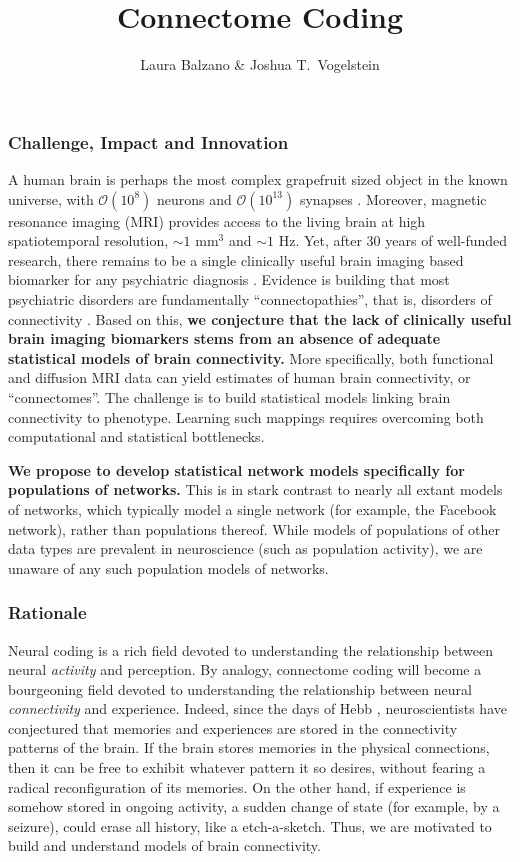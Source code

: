\documentclass[times,11pt]{article} %
\title{\vspace{-50pt}Connectome Coding}
\author{Laura Balzano \& Joshua T.~Vogelstein}
\date{}
\begin{document}
\renewcommand\thepage{C-1}


\maketitle

\subsubsection*{Challenge, Impact and Innovation}

A human brain is perhaps the most complex grapefruit sized object in the known universe, with $\mathcal{O}(10^8)$ neurons and $\mathcal{O}(10^{13})$ synapses \cite{??}.   Moreover,  magnetic resonance imaging (MRI) provides access to the living brain at high spatiotemporal resolution, $\sim$$1$ mm$^3$ and $\sim$$1$ Hz.  Yet, after 30 years of well-funded research, there remains to be a single clinically useful brain imaging based biomarker for any psychiatric diagnosis \cite{APA}. 
% 
Evidence is building that most psychiatric disorders are fundamentally ``connectopathies'', that is, disorders of connectivity \cite{??}. Based on this, 
\textbf{we conjecture that the lack of clinically useful brain imaging biomarkers stems from an absence of adequate statistical models of brain connectivity.} More specifically, both functional and diffusion MRI data can yield estimates of human brain connectivity, or ``connectomes''.  The challenge is to build statistical models linking brain connectivity to phenotype.  Learning such mappings requires overcoming both computational and statistical bottlenecks.

% 
\textbf{We propose to develop statistical network models specifically for populations of networks. }  This is in stark contrast to nearly all extant models of networks, which typically model a single network (for example, the Facebook network), rather than populations thereof.  While models of populations of other data types are prevalent in neuroscience (such as population activity), we are unaware of any such population models of networks.



\subsubsection*{Rationale}

Neural coding is a rich field devoted to understanding the relationship between neural \emph{activity} and perception.  By analogy, connectome coding will become a bourgeoning field devoted to understanding the relationship between neural \emph{connectivity} and experience.  Indeed, since the days of Hebb \cite{??}, neuroscientists have conjectured that memories and experiences are stored in the connectivity patterns of the brain.  If the brain stores memories in the physical connections, then it can be free to exhibit whatever pattern it so desires, without fearing a radical reconfiguration of its memories.  On the other hand, if experience is somehow stored in ongoing activity, a sudden change of state (for example, by a seizure), could erase all history, like a etch-a-sketch.   Thus, we are motivated to build and understand models of brain connectivity. 
\end{document}
